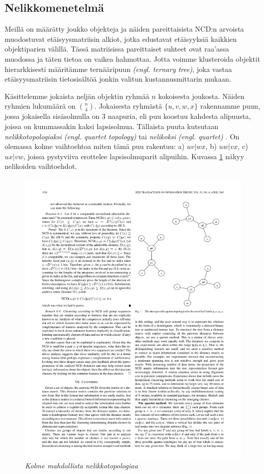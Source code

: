 \documentclass[12pt,finnish,final]{tktltiki2}
\theoremstyle{definition}
\theoremstyle{remark}
\newcommand{\engl}[1]{\emph{(engl. #1)}}
\begin{document}
  \subsection{Nelikkomenetelmä} %
  \label{sub:nelikkomenetelma}
    Meillä on määrätty joukko objekteja ja näiden pareittaisista NCD:n arvoista muodostuvat etäisyysmatriisin alkiot, jotka edustavat etäisyyksiä kaikkien objektiparien välillä.
    Tässä matriisissa pareittaiset suhteet ovat raa'assa muodossa ja täten tietoa on vaikea hahmottaa.
    Jotta voimme klusteroida objektit hierarkkisesti määritämme ternääripuun \engl{ternary tree}, joka vastaa etäisyysmatriisin tietosisältöä jonkin valitun kustannusmittarin mukaan.

    Käsittelemme jokaista neljän objektin ryhmää $n$ kokoisesta joukosta. Näiden ryhmien lukumäärä on $\binom{n}{4}$.
    Jokaisesta ryhmästä $\{u,v,w,x\}$ rakennamme puun, jossa jokaisella sisäsolmulla on 3 naapuria, eli puu koostuu kahdesta alipuusta, joissa on kummassakin kaksi lapsisolmua.
    Tällaista puuta kutsutaan \emph{nelikkotopologiaksi} \engl{quartet topology} \cite{CV05} tai \emph{nelikoksi} \engl{quartet} \cite{cilibrasi2004algorithmic}.
    On olemassa kolme vaihtoehtoa miten tämä puu rakentuu: a) $uv|wx$, b) $uw|vx$, c) $ux|vw$, joissa pystyviiva erottelee lapsisolmuparit alipuihin. Kuvassa \ref{fig:ternary-tree} näkyy nelikoiden vaihtoehdot.

    \begin{figure}[tb]
      \immediate{}
      \includegraphics{img/ternary-tree}
      \caption{\emph{Kolme mahdollista nelikkotopologiaa}
      \cite{CV05}}
      \label{fig:ternary-tree}
    \end{figure}
\end{document}
